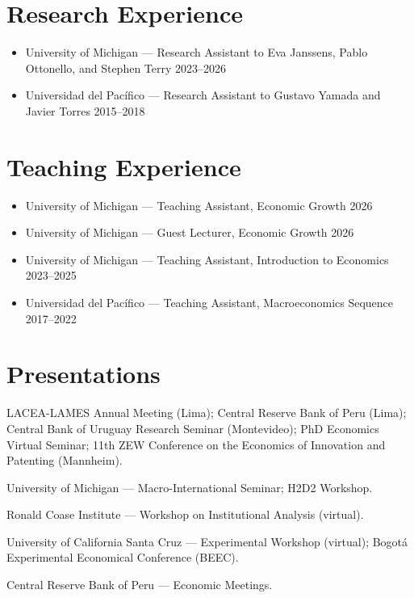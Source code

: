 \documentclass[letterpaper]{article}
\newcommand{\daterange}[1]{\hfill #1}
\begin{document}
\section*{Research Experience}
\begin{itemize}
  \item University of Michigan --- Research Assistant to Eva Janssens, Pablo Ottonello, and Stephen Terry \daterange{2023--2026}
  \item Universidad del Pac\'ifico --- Research Assistant to Gustavo Yamada and Javier Torres \daterange{2015--2018}
\end{itemize}

\section*{Teaching Experience}
\begin{itemize}
  \item University of Michigan --- Teaching Assistant, Economic Growth \daterange{2026}
  \item University of Michigan --- Guest Lecturer, Economic Growth \daterange{2026}
  \item University of Michigan --- Teaching Assistant, Introduction to Economics \daterange{2023--2025}
  \item Universidad del Pac\'ifico --- Teaching Assistant, Macroeconomics Sequence \daterange{2017--2022}
\end{itemize}

\section*{Presentations}
\begin{description}[leftmargin=6em, labelwidth=5.4em, labelsep=0.6em,
                    font=\normalfont, itemsep=0.15em, topsep=0.15em]
  \item[2026] LACEA-LAMES Annual Meeting (Lima); Central Reserve Bank of Peru (Lima); Central Bank of Uruguay Research Seminar (Montevideo); PhD Economics Virtual Seminar; 11th ZEW Conference on the Economics of Innovation and Patenting (Mannheim).
  \item[2024--2026] University of Michigan --- Macro-International Seminar; H2D2 Workshop.
  \item[2021] Ronald Coase Institute --- Workshop on Institutional Analysis (virtual).
  \item[2020] University of California Santa Cruz --- Experimental Workshop (virtual); Bogot\'a Experimental Economical Conference (BEEC).
  \item[2018--2019] Central Reserve Bank of Peru --- Economic Meetings.
\end{description}
\end{document}
